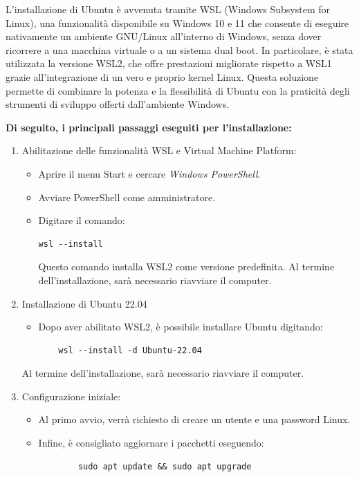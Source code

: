 \documentclass[11pt]{report}
\begin{document}
L’installazione di Ubuntu è avvenuta tramite WSL (Windows Subsystem for Linux), una funzionalità disponibile su Windows 10 e 11 che consente di eseguire nativamente un ambiente GNU/Linux all’interno di Windows, senza dover ricorrere a una macchina virtuale o a un sistema dual boot.
In particolare, è stata utilizzata la versione WSL2, che offre prestazioni migliorate rispetto a WSL1 grazie all’integrazione di un vero e proprio kernel Linux. Questa soluzione permette di combinare la potenza e la flessibilità di Ubuntu con la praticità degli strumenti di sviluppo offerti dall’ambiente Windows.

\textbf{Di seguito, i principali passaggi eseguiti per l’installazione:} \cite{Ubuntu-install}

\begin{enumerate}
    \item Abilitazione delle funzionalità WSL e Virtual Machine Platform:
    \begin{itemize}
        \item Aprire il menu Start e cercare \textit{Windows PowerShell}.
        \item Avviare PowerShell come amministratore.
        \item Digitare il comando:
        \begin{verbatim}
wsl --install
        \end{verbatim}
        Questo comando installa WSL2 come versione predefinita. Al termine dell’installazione, sarà necessario riavviare il computer.
    \end{itemize}
    \item Installazione di Ubuntu 22.04
        \begin{itemize}
            \item Dopo aver abilitato WSL2, è possibile installare Ubuntu digitando:
            \begin{verbatim}
    wsl --install -d Ubuntu-22.04
            \end{verbatim}
        \end{itemize}
    Al termine dell’installazione, sarà necessario riavviare il computer.


    \item Configurazione iniziale:
        \begin{itemize}
            \item Al primo avvio, verrà richiesto di creare un utente e una password Linux.
            \item Infine, è consigliato aggiornare i pacchetti eseguendo:
            \begin{verbatim}
        sudo apt update && sudo apt upgrade
            \end{verbatim}
        \end{itemize}
\end{enumerate}
\end{document}
